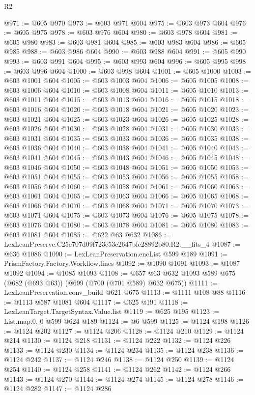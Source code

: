 \begin{lexlean}{R2}
\begin{coremodule}
@971 := @605 @970
@973 := @603 @971 @604
@975 := @603 @973 @604
@976 := @605 @975
@978 := @603 @976 @604
@980 := @603 @978 @604
@981 := @605 @980
@983 := @603 @981 @604
@985 := @603 @983 @604
@986 := @605 @985
@988 := @603 @986 @604
@990 := @603 @988 @604
@991 := @605 @990
@993 := @603 @991 @604
@995 := @603 @993 @604
@996 := @605 @995
@998 := @603 @996 @604
@1000 := @603 @998 @604
@1001 := @605 @1000
@1003 := @603 @1001 @604
@1005 := @603 @1003 @604
@1006 := @605 @1005
@1008 := @603 @1006 @604
@1010 := @603 @1008 @604
@1011 := @605 @1010
@1013 := @603 @1011 @604
@1015 := @603 @1013 @604
@1016 := @605 @1015
@1018 := @603 @1016 @604
@1020 := @603 @1018 @604
@1021 := @605 @1020
@1023 := @603 @1021 @604
@1025 := @603 @1023 @604
@1026 := @605 @1025
@1028 := @603 @1026 @604
@1030 := @603 @1028 @604
@1031 := @605 @1030
@1033 := @603 @1031 @604
@1035 := @603 @1033 @604
@1036 := @605 @1035
@1038 := @603 @1036 @604
@1040 := @603 @1038 @604
@1041 := @605 @1040
@1043 := @603 @1041 @604
@1045 := @603 @1043 @604
@1046 := @605 @1045
@1048 := @603 @1046 @604
@1050 := @603 @1048 @604
@1051 := @605 @1050
@1053 := @603 @1051 @604
@1055 := @603 @1053 @604
@1056 := @605 @1055
@1058 := @603 @1056 @604
@1060 := @603 @1058 @604
@1061 := @605 @1060
@1063 := @603 @1061 @604
@1065 := @603 @1063 @604
@1066 := @605 @1065
@1068 := @603 @1066 @604
@1070 := @603 @1068 @604
@1071 := @605 @1070
@1073 := @603 @1071 @604
@1075 := @603 @1073 @604
@1076 := @605 @1075
@1078 := @603 @1076 @604
@1080 := @603 @1078 @604
@1081 := @605 @1080
@1083 := @603 @1081 @604
@1085 := @622 @63 @632
@1086 := LexLeanPreserve.C25e707d09f723e53c2647bfc28892b80.R2.__fits_4
@1087 := @636 @1086
@1090 := LexLeanPreservation.encList @599 @189
@1091 := PrismFactory.Factory.Workflow.lines
@1092 := @1090 @1091
@1093 := @1087 @1092
@1094 := @1085 @1093
@1108 := @657 @63 @632 @1093 @589 @675 (@682 (@693 @63)) (@699 (@700 (@701 @589) @632 @675))
@1111 := LexLeanPreservation.conv_build @621 @675
@1113 := @1111 @108 @88
@1116 := @1113 @587 @1081 @604
@1117 := @625 @191
@1118 := LexLeanTarget.TargetSyntax.Value.list
@1119 := @625 @195
@1123 := List.map.{0, 0} @599 @624 @189
@1124 := @6 @599
@1125 := @1124 @198
@1126 := @1124 @202
@1127 := @1124 @206
@1128 := @1124 @210
@1129 := @1124 @214
@1130 := @1124 @218
@1131 := @1124 @222
@1132 := @1124 @226
@1133 := @1124 @230
@1134 := @1124 @234
@1135 := @1124 @238
@1136 := @1124 @242
@1137 := @1124 @246
@1138 := @1124 @250
@1139 := @1124 @254
@1140 := @1124 @258
@1141 := @1124 @262
@1142 := @1124 @266
@1143 := @1124 @270
@1144 := @1124 @274
@1145 := @1124 @278
@1146 := @1124 @282
@1147 := @1124 @286

\end{coremodule}
\end{lexlean}
